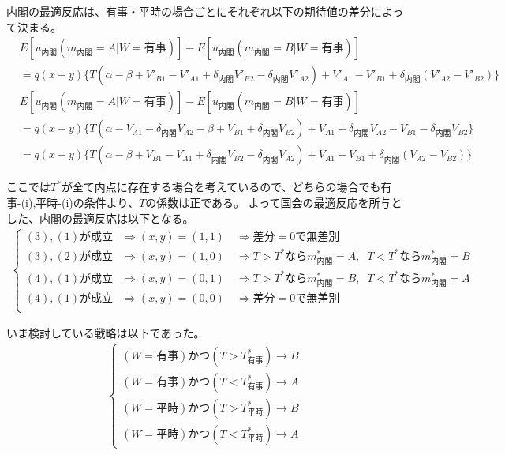 \documentclass[main.tex]{subfiles}
\begin{document}
内閣の最適反応は、有事・平時の場合ごとにそれぞれ以下の期待値の差分によって決まる。
\begin{align*}
    &E[u_{内閣}(m_{内閣}=A|W=有事)] - E[u_{内閣}(m_{内閣}=B|W=有事)] \\
    &= q(x-y) \lbrace T(\alpha-\beta + V'_{B1}-V'_{A1} + \delta_{内閣}V'_{B2} - \delta_{内閣}V'_{A2}) + V'_{A1} - V'_{B1} + \delta_{内閣}(V'_{A2} - V'_{B2})  \rbrace 
\end{align*}
\begin{align*}
    &E[u_{内閣}(m_{内閣}=A|W=有事)] - E[u_{内閣}(m_{内閣}=B|W=有事)] \\
    &= q(x-y)\lbrace T(\alpha -V_{A1} -\delta_{内閣}V_{A2} - \beta + V_{B1} + \delta_{内閣}V_{B2}) + V_{A1} + \delta_{内閣}V_{A2} - V_{B1} - \delta_{内閣}V_{B2}  \rbrace\\
    &= q(x-y)\lbrace T(\alpha - \beta + V_{B1}-V_{A1} + \delta_{内閣}V_{B2} -\delta_{内閣}V_{A2}   ) + V_{A1} - V_{B1} + \delta_{内閣}(V_{A2}  - V_{B2})  \rbrace
\end{align*}


ここでは$T^*$が全て内点に存在する場合を考えているので、どちらの場合でも有事-(i),平時-(i)の条件より、$T$の係数は正である。
よって国会の最適反応を所与とした、内閣の最適反応は以下となる。
\begin{align*}
    \begin{cases}
        (3),(1)が成立 &\Rightarrow (x,y)=(1,1) \quad \Rightarrow 差分=0で無差別\\
        (3),(2)が成立 &\Rightarrow (x,y)=(1,0) \quad \Rightarrow T>T^* なら m^*_{内閣}=A,\;\; T<T^* なら m^*_{内閣}=B\\
        (4),(1)が成立 &\Rightarrow (x,y)=(0,1) \quad \Rightarrow T>T^* なら m^*_{内閣}=B,\;\; T<T^* なら m^*_{内閣}=A\\
        (4),(1)が成立 &\Rightarrow (x,y)=(0,0) \quad \Rightarrow 差分=0で無差別\\
     \end{cases}
\end{align*}

いま検討している戦略は以下であった。
\begin{align*}
    \begin{cases}
        (W=有事) かつ (T>T^*_{有事})  \rightarrow B\\
        (W=有事) かつ (T<T^*_{有事})  \rightarrow A\\
        (W=平時) かつ (T>T^*_{平時})  \rightarrow B\\
        (W=平時) かつ (T<T^*_{平時})   \rightarrow A
    \end{cases}
\end{align*}
\end{document}
